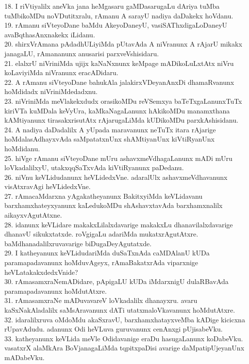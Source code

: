 \documentclass{article}
\begin{document}
18. I riVtiyalilx aneVka jana heMgasaru gaMDasarugaLu dAriya tuMba tuMbikoMDu noVDutitxralu, rAmanu A sarayU nadiya daDakekx hoVdanu.\\
19. rAmanu siVteyoDane baMdu AkeyoDaneyU, vasiSAThxdigaLoDaneyU avaBqthasAnxnakekx iLidanu.\\
20. shirxVrAmana pAdadhULiyiMda pUtavAda A niVranunx A rAjarU mikakx janagaLU, rAmananunx anusarisi parxveVshisidaru.\\
21. elalxrU niVriniMda ujijx kaNaNxnunx keMpage mADikoLuLxtAtx niVru koLaviyiMda niVranunx eracADidaru.\\
22. A rAmanu siVteyoDane bahukAla jalakirxVDeyanAnxDi dhamaRvanunx hoMdidadx niVriniMdedadxnu.\\
23. niVriniMda meVlakekxdudx orasikoMDu reVSemxya baTeTxgaLanunxTuTx kiriVTa kuMDala keVyUra, kaMkaNagaLanunx hAkikoMDu manamxthana kAMtiyanunx tirasakxrisutAtx rAjarugaLiMda kUDikoMDu parxkAshisidanu.\\
24. A nadiya daDadalilx A yUpada maravanunx neTuTx itara rAjarige hoMdalasAdhayxvAda saMpatatxnUnx shAMtiyanUnx kiVtiRyanUnx hoMdidanu.\\
25. hiVge rAmanu siVteyoDane mUru ashavxmeVdhagaLanunx mADi mUru loVkadalilxyU, utakxqqSaTxvAda kiVtiRyanunx paDedanu.\\
26. niVnu keVLidudanunx heVLidedxVne. adaralUlx ashavxmeVdhavanunx visAtxravAgi heVLidedxVne.\\
27. rAmacaMdarxna yAgakatheyanunx BakitxyiMda keVLidavanu barxhamxhateyxyanunx kaLedukoMDu shAshavxtavAda barxhamxnalilx aikayxvAgutAtxne.\\
28. idanunx keVLidare makakxLilalxdavarige makakxLu dhanavilalxdavarige dhanavU sikukxtatxde. roVgigaLu adariMda mukatxrAgutAtxre. baMdhanadalilxruvavarige biDugaDeyAgutatxde.\\
29. I katheyanunx keVLidudariMda duSaTxnAda caMDAlanU kUDa paramapadavanunx hoMduvAgeyx, rAmaBakatxrAda viparxnige heVLatakakxdedxVnide?\\
30. rAmasamxraNemADidare, pApigaLU kUDa iMdarxnigU dulaRBavAda paramapadavanunx hoMdutAtxre.\\
31. rAmasamxraNe mADuvavareV loVkadalilx dhanayxru. avaru kaSxNakAladalilx saMsAravanunx dATi utatxmaloVkavanunx hoMdutAtxre.\\
32. idaralilxruva oMdoMdu akaSxravU, barxhamxhatayxveMba kADige kicicxna rUpavAdudu. adanunx Odi heVLuva guruvanunx cenAnxgi pUjisabeVku.\\
33. katheyanunx keVLida meVle Odidavanige eraDu hasugaLanunx koDabeVku. vasatxrX alaMkAra BoVjanagaLiMda tqpitxpaDisi avarige daMpatipUjeyanUnx mADabeVku.\\
\end{document}
